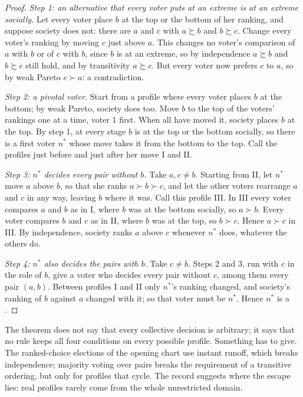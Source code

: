 \begin{proof}
\emph{Step 1: an alternative that every voter puts at an extreme is at an extreme socially.} Let every voter
place $b$ at the top or the bottom of her ranking, and suppose society does not: there are $a$ and $c$ with
$a \succsim b$ and $b \succsim c$. Change every voter's ranking by moving $c$ just above $a$. This changes no
voter's comparison of $a$ with $b$ or of $c$ with $b$, since $b$ is at an extreme, so by independence $a
\succsim b$ and $b \succsim c$ still hold, and by transitivity $a \succsim c$. But every voter now prefers $c$
to $a$, so by weak Pareto $c \succ a$: a contradiction.

\emph{Step 2: a pivotal voter.} Start from a profile where every voter places $b$ at the bottom; by weak
Pareto, society does too. Move $b$ to the top of the voters' rankings one at a time, voter 1 first. When all
have moved it, society places $b$ at the top. By step 1, at every stage $b$ is at the top or the bottom
socially, so there is a first voter $n^*$ whose move takes it from the bottom to the top. Call the profiles
just before and just after her move I and II.

\emph{Step 3: $n^*$ decides every pair without $b$.} Take $a, c \ne b$. Starting from II, let $n^*$ move $a$
above $b$, so that she ranks $a \succ b \succ c$, and let the other voters rearrange $a$ and $c$ in any way,
leaving $b$ where it was. Call this profile III. In III every voter compares $a$ and $b$ as in I, where $b$
was at the bottom socially, so $a \succ b$. Every voter compares $b$ and $c$ as in II, where $b$ was at the
top, so $b \succ c$. Hence $a \succ c$ in III. By independence, society ranks $a$ above $c$ whenever $n^*$
does, whatever the others do.

\emph{Step 4: $n^*$ also decides the pairs with $b$.} Take $c \ne b$. Steps 2 and 3, run with $c$ in the role of
$b$, give a voter who decides every pair without $c$, among them every pair $(a, b)$. Between profiles I and
II only $n^*$'s ranking changed, and society's ranking of $b$ against $a$ changed with it; so that voter
must be $n^*$. Hence $n^*$ is a .
\end{proof}

The theorem does not say that every collective decision is arbitrary; it says that no rule keeps all four
conditions on every possible profile. Something has to give. The ranked-choice elections of the opening
chart use instant runoff, which breaks independence; majority voting over pairs breaks the requirement of
a transitive ordering, but only for profiles that cycle. The record suggests where the escape lies:
real profiles rarely come from the whole unrestricted domain.

